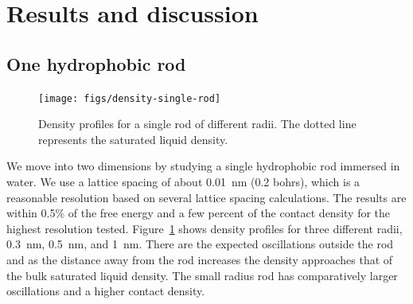 \documentclass[letterpaper,twocolumn,amsmath,amssymb,prb]{revtex4-1}
\begin{document}
% 
% 
%
\section{Results and discussion}

\subsection{One hydrophobic rod}

\begin{figure}
\begin{center}
\texttt{[image: figs/density-single-rod]}
\end{center}
\caption{ Density profiles for a single rod of different radii. The dotted line
represents the saturated liquid density.  }
\label{fig:density-single-rod}
\end{figure}

We move into two dimensions by studying a single hydrophobic rod
immersed in water. We use a lattice spacing of about 0.01~nm (0.2 bohrs), 
which is a reasonable resolution based on several lattice spacing calculations.
The results are within 0.5\% of the free energy and a few percent of the contact
density for the highest resolution tested.
Figure~\ref{fig:density-single-rod} shows density
profiles for three different radii, 0.3~nm, 0.5~nm, and 1~nm. There are the
expected oscillations outside the rod and as the distance away from the rod
increases
the density approaches that of the bulk saturated liquid density. The small
radius
rod has comparatively larger oscillations and a higher contact density.
\end{document}

